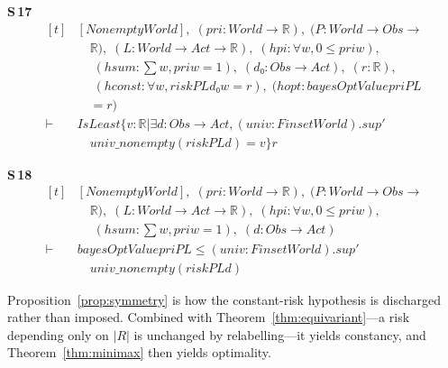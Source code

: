 \noindent\textbf{S\,17}\quad{}
{\footnotesize\[ \begin{aligned}[t]
&[\mathit{Nonempty} \mathit{World}],\; (\mathit{pri} : \mathit{World} \to \mathbb{R} ),\; (\mathit{P} : \mathit{World} \to \mathit{Obs} \to\\
&\quad \mathbb{R} ),\; (\mathit{L} : \mathit{World} \to \mathit{Act} \to \mathbb{R} ),\; (\mathit{hpi} : \forall \mathit{w}, 0 \leq \mathit{pri} \mathit{w}),\\
&\quad \; (\mathit{hsum} : \textstyle\sum \mathit{w}, \mathit{pri} \mathit{w} = 1),\; (\mathit{d₀} : \mathit{Obs} \to \mathit{Act}),\; (\mathit{r} : \mathbb{R} ),\\
&\quad \; (\mathit{hconst} : \forall \mathit{w}, \mathit{risk} \mathit{P} \mathit{L} \mathit{d₀} \mathit{w} = \mathit{r}),\; (\mathit{hopt} : \mathit{bayesOptValue} \mathit{pri} \mathit{P} \mathit{L}\\
&\quad = \mathit{r})\\
\vdash\;&\mathit{IsLeast} \{ \mathit{v} : \mathbb{R} | \exists \mathit{d} : \mathit{Obs} \to \mathit{Act}, (\mathit{univ} : \mathit{Finset} \mathit{World}).\mathit{sup'}\\
&\quad \mathit{univ\_nonempty} (\mathit{risk} \mathit{P} \mathit{L} \mathit{d}) = \mathit{v}\} \mathit{r}
\end{aligned} \]}

\noindent\textbf{S\,18}\quad{}
{\footnotesize\[ \begin{aligned}[t]
&[\mathit{Nonempty} \mathit{World}],\; (\mathit{pri} : \mathit{World} \to \mathbb{R} ),\; (\mathit{P} : \mathit{World} \to \mathit{Obs} \to\\
&\quad \mathbb{R} ),\; (\mathit{L} : \mathit{World} \to \mathit{Act} \to \mathbb{R} ),\; (\mathit{hpi} : \forall \mathit{w}, 0 \leq \mathit{pri} \mathit{w}),\\
&\quad \; (\mathit{hsum} : \textstyle\sum \mathit{w}, \mathit{pri} \mathit{w} = 1),\; (\mathit{d} : \mathit{Obs} \to \mathit{Act})\\
\vdash\;&\mathit{bayesOptValue} \mathit{pri} \mathit{P} \mathit{L} \leq (\mathit{univ} : \mathit{Finset} \mathit{World}).\mathit{sup'}\\
&\quad \mathit{univ\_nonempty} (\mathit{risk} \mathit{P} \mathit{L} \mathit{d})
\end{aligned} \]}


Proposition~\ref{prop:symmetry} is how the constant-risk hypothesis is discharged rather than
imposed. Combined with Theorem~\ref{thm:equivariant}---a risk depending only on $|R|$ is
unchanged by relabelling---it yields constancy, and Theorem~\ref{thm:minimax} then yields
optimality.

